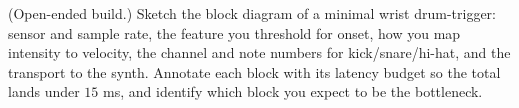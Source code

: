 \begin{exercise}
(Open-ended build.) Sketch the block diagram of a minimal wrist drum-trigger: sensor and sample rate,
the feature you threshold for onset, how you map intensity to velocity, the channel and note numbers
for kick/snare/hi-hat, and the transport to the synth. Annotate each block with its latency budget so
the total lands under $15$ ms, and identify which block you expect to be the bottleneck.
\end{exercise}
